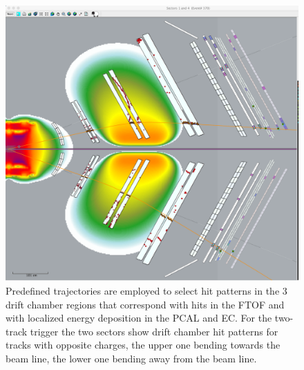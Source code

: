 \documentclass[final,3p,twocolumn]{elsarticle}
\begin{document}
\begin{figure}[htbp!]
\centerline{\includegraphics[width=0.95\columnwidth]{trigger.png}}
\caption{Predefined trajectories are employed to select hit patterns
in the 3 drift chamber regions that correspond with hits in the FTOF and with localized energy deposition in the 
PCAL and EC. For the two-track trigger the two sectors show drift chamber hit patterns for tracks with opposite charges,
 the upper one bending towards the beam line, the lower one bending away from the beam line.  }
\label{trigger}
\end{figure}    
\end{document}
